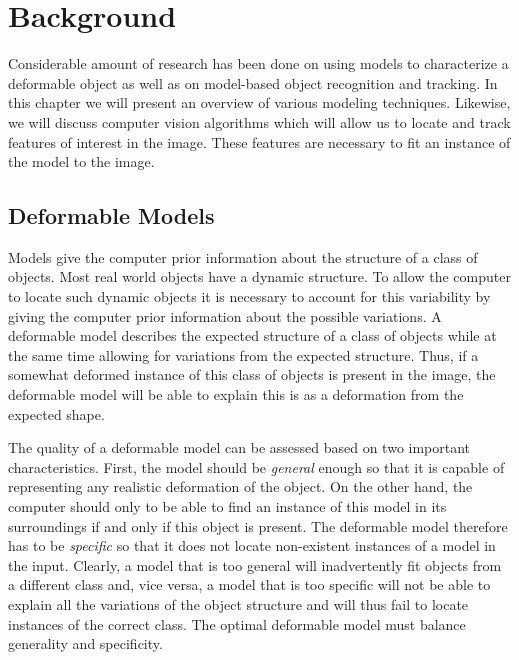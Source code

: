 \documentclass[11pt,a4paper]{report}
\begin{document}
\chapter{Background}
Considerable amount of research has been done on using models to characterize a
deformable object as well as on model-based object recognition and
tracking. In this chapter we will present an overview of various modeling techniques. Likewise, we will discuss
computer vision algorithms which will allow us to locate and track features of
interest in the image. These features are necessary to fit an instance
of the model to the image.

\section{Deformable Models}
Models give the computer prior information about the structure of a class of objects. Most
real world objects have a dynamic structure. To allow the computer to locate
such dynamic objects it is necessary to account for this variability by giving the
computer prior information about the possible variations. A deformable model
describes the expected structure of a class of objects while at the same time allowing
for variations from the expected structure. Thus, if a somewhat deformed
instance of this class of objects is present in the image, the deformable model
will be able to explain this is as a deformation from the expected shape.

The quality of a deformable model can be assessed based on two important
characteristics. First, the model should be \textit{general} enough so that it
is capable of representing any realistic deformation of the object.
On the other hand, the computer should only to be able to find an instance of this
model in its surroundings if and only if this object is present. The deformable model
therefore has to be \textit{specific} so that it does not locate non-existent
instances of a model in the input. Clearly, a model that is too general will inadvertently fit objects from a
different class and, vice versa, a model that is too specific will not be able to
explain all the variations of the object structure and will thus fail to locate
instances of the correct class. The optimal deformable model must balance
generality and specificity.
\end{document}

